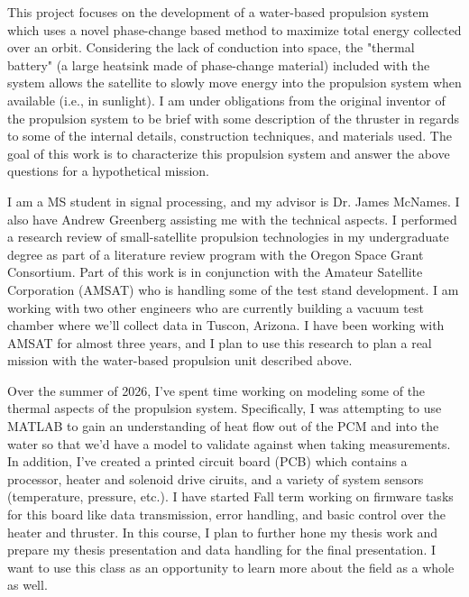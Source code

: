 This project focuses on the development of a water-based propulsion system which uses a novel phase-change based method to maximize total energy collected over an orbit. Considering the lack of conduction into space, the "thermal battery" (a large heatsink made of phase-change material) included with the system allows the satellite to slowly move energy into the propulsion system when available (i.e., in sunlight). I am under obligations from the original inventor of the propulsion system to be brief with some description of the thruster in regards to some of the internal details, construction techniques, and materials used. The goal of this work is to characterize this propulsion system and answer the above questions for a hypothetical mission.

I am a MS student in signal processing, and my advisor is Dr. James McNames. I also have Andrew Greenberg assisting me with the technical aspects. I performed a research review of small-satellite propulsion technologies in my undergraduate degree as part of a literature review program with the Oregon Space Grant Consortium. Part of this work is in conjunction with the Amateur Satellite Corporation (AMSAT) who is handling some of the test stand development. I am working with two other engineers who are currently building a vacuum test chamber where we'll collect data in Tuscon, Arizona. I have been working with AMSAT for almost three years, and I plan to use this research to plan a real mission with the water-based propulsion unit described above.

Over the summer of 2026, I've spent time working on modeling some of the thermal aspects of the propulsion system. Specifically, I was attempting to use MATLAB to gain an understanding of heat flow out of the PCM and into the water so that we'd have a model to validate against when taking measurements. In addition, I've created a printed circuit board (PCB) which contains a processor, heater and solenoid drive ciruits, and a variety of system sensors (temperature, pressure, etc.). I have started Fall term working on firmware tasks for this board like data transmission, error handling, and basic control over the heater and thruster. In this course, I plan to further hone my thesis work and prepare my thesis presentation and data handling for the final presentation. I want to use this class as an opportunity to learn more about the field as a whole as well.
